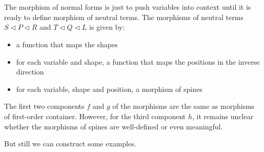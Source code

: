 \begin{code}
\AgdaSymbol{:}\AgdaSpace{}%
\AgdaSpace{}%
\AgdaSpace{}%
\AgdaSpace{}%
\AgdaSpace{}%
\AgdaSpace{}%
\AgdaSpace{}%
\AgdaSpace{}%
\AgdaSpace{}%
\AgdaSpace{}%
\AgdaSpace{}%
\AgdaSpace{}%
\<%
\\
\>[2][@{}l@{\AgdaIndent{0}}]%
\>[4]%
\>[8]\AgdaSymbol{:}\AgdaSpace{}%
\AgdaSpace{}%
\AgdaSpace{}%
\<%
\\
%
\>[4]\AgdaOperator{\AgdaInductiveConstructor{\AgdaUnderscore{},\AgdaUnderscore{}}}\AgdaSpace{}%
\AgdaSymbol{:}\AgdaSpace{}%
\AgdaSpace{}%
\AgdaSpace{}%
\AgdaSpace{}%
\AgdaSpace{}%
\AgdaSpace{}%
\AgdaSpace{}%
\AgdaSpace{}%
\AgdaSpace{}%
\AgdaSpace{}%
\AgdaSymbol{(}\AgdaSpace{}%
\AgdaOperator{\AgdaInductiveConstructor{,}}\AgdaSpace{}%
\AgdaSymbol{)}\AgdaSpace{}%
\AgdaSymbol{(}\AgdaSpace{}%
\AgdaOperator{\AgdaInductiveConstructor{,}}\AgdaSpace{}%
\AgdaSymbol{)}\<%
\end{code}

The morphism of normal forms is just to push variables into context until it is ready to define morphism of neutral terms. The morphisms of neutral terms $S \triangleleft P \triangleleft R$ and $T \triangleleft Q \triangleleft L$ is given by:

\begin{itemize}
  \item{a function that maps the shapes}
  \item{for each variable and shape, a function that maps the positions in the inverse direction}
  \item{for each variable, shape and position, a morphism of spines}
\end{itemize}

The first two components $f$ and $g$ of the morphisms are the same as morphisms of first-order container. However, for the third component $h$, it remains unclear whether the morphisms of spines are well-defined or even meaningful.

But still we can construct some examples. \hyperref[Hom]{\faCog}

